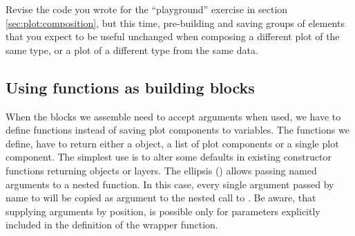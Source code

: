 \documentclass[krantz2]{krantz}\usepackage{knitr}%
\begin{document}
\begin{knitrout}\footnotesize
{}\color{fgcolor}\begin{kframe}
\begin{alltt}
 \hlkwb{<-}  \hlstd{(}\hlstd{))}
 \hlopt{+} 
\end{alltt}
\end{kframe}
\end{knitrout}

\begin{playground}
Revise the code you wrote for the ``playground'' exercise in section \ref{sec:plot:composition}, but this time, pre-building and saving groups of elements that you expect to be useful unchanged when composing a different plot of the same type, or a plot of a different type from the same data.
\end{playground}

\subsection{Using functions as building blocks}

When the blocks we assemble need to accept arguments when used, we have to define functions instead of saving plot components to variables. The functions we define, have to return either a  object, a list of plot components or a single plot component. The simplest use is to alter some defaults in existing constructor functions returning  objects or layers. The ellipsis () allows passing named arguments to a nested function. In this case, every single argument passed by name to  will be copied as argument to the nested call to . Be aware, that supplying arguments by position, is possible only for parameters explicitly included in the definition of the wrapper function.

\begin{knitrout}\footnotesize
{}\color{fgcolor}\begin{kframe}
\begin{alltt}
 \hlkwb{<-} \hlstd{(}\hlstd{) \{}
   \hlopt{+}
  \hlstd{()}
\hlstd{\}}
\end{alltt}
\end{kframe}
\end{knitrout}
\end{document}
